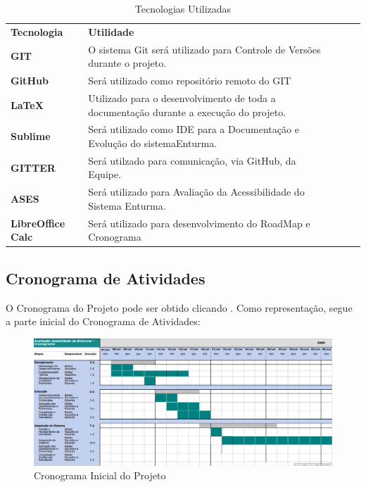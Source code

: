 	\begin{table}[H]
		\centering
		
		\label{tecnologias}
		\begin{tabular}{|l|l|lll}
			\cline{1-2}
			{\bf Tecnologia} & {\bf Utilidade}                                                                                          & {\bf } &  &  \\ \cline{1-2}
			{\bf GIT}        & O sistema Git será utilizado para Controle de Versões durante o projeto.      &        &  &  \\ \cline{1-2}
			{\bf GitHub}     & Será utilizado como repositório remoto do GIT           &        &  &  \\ \cline{1-2}
			{\bf LaTeX}      & Utilizado para o desenvolvimento de toda a documentação durante a execução do projeto. &        &  &  \\ \cline{1-2}
			{\bf Sublime}    & Será utilizado como IDE para a Documentação e Evolução do sistemaEnturma.   &        &  &  \\ \cline{1-2}
			{\bf GITTER}     & Será utilzado para comunicação, via GitHub, da Equipe.                 &        &  &  \\ \cline{1-2}
			{\bf ASES}       & Será utilizado para Avaliação da Acessibilidade do Sistema Enturma. &        &  &  \\ \cline{1-2}
			{\bf LibreOffice Calc}       & Será utilizado para desenvolvimento do RoadMap e Cronograma &        &  &  \\ \cline{1-2}
		\end{tabular}
		\caption{Tecnologias Utilizadas}
	\end{table}

\subsection{Cronograma de Atividades}

	O Cronograma do Projeto pode ser obtido clicando \href{https://docs.google.com/spreadsheets/d/1uaGUFw3tpqgcV94JXcte_O7jXWjGxHUPm23UfJ4OCh8}{}. Como representação, segue a parte inicial do Cronograma de Atividades:

	\begin{figure}[H]
		\centering
		\includegraphics[width=1\textwidth]{imagens/cronograma}
		\caption{Cronograma Inicial do Projeto}
		\label{img:cronograma}
	\end{figure}

